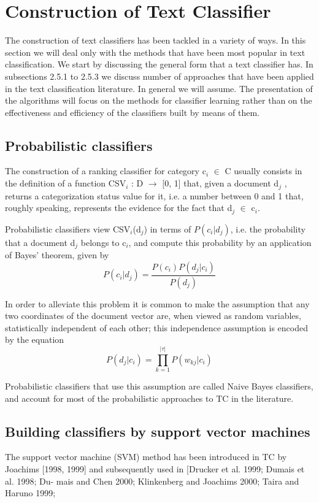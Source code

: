 \section{Construction of Text Classifier}
The construction of text classifiers has been tackled in a variety of ways.
In this section we will deal only with the methods that have been most popular in text classification. We start by discussing the general form that a text classifier has.  In subsections 2.5.1 to 2.5.3 we discuss number of approaches that have been applied in the text classification literature. In general we will assume. The presentation of the algorithms will focus on the methods for classifier learning rather than on the effectiveness and efficiency of the classifiers built by means of them.\cite{Sebastiani2002}

\subsection{Probabilistic classifiers}
The construction of a ranking classifier for category c$_{i}$ $\in$ C usually
consists in the definition of a function CSV$_{i}$ : D $\rightarrow$ [0, 1] that, given a document d$_{j}$ , returns a categorization status value for it, i.e. a number between 0 and 1 that, roughly speaking, represents the evidence for the fact that d$_{j}$ $\in$ c$_{i}$.

Probabilistic classifiers view CSV$_{i}$(d$_{j}$) in terms of $P(c_{i} | d_{j})$, i.e. the probability that a document d$_{j}$ belongs to c$_{i}$, and compute this probability by an application of Bayes’ theorem, given by \[ P(c_{i}|d_{j}) = \frac{P(c_{i})P(d_{j}|c_{i})}{P(d_{j})} \]

In order to alleviate this problem it is common to make the assumption that any two coordinates of the document vector are, when viewed as random variables, statistically independent of each other; this independence assumption is encoded by the equation
\[ P(d_{j}|c_{i}) = \prod_{k=1}^{|\tau|} P(w_{kj}|c_{i}) \]

Probabilistic classifiers that use this assumption are called Naive Bayes classifiers, and account for most of the probabilistic approaches to TC in the literature.

\subsection{Building classifiers by support vector machines}
The support vector machine (SVM) method has been introduced in TC by Joachims [1998, 1999] and subsequently used in [Drucker et al. 1999; Dumais et al. 1998; Du- mais and Chen 2000; Klinkenberg and Joachims 2000; Taira and Haruno 1999;

